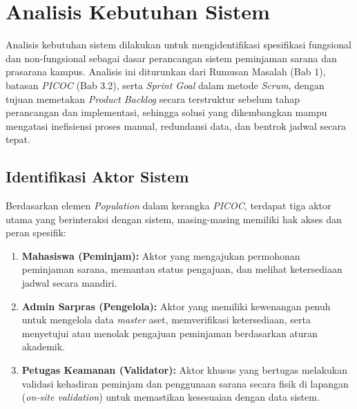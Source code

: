 \section{Analisis Kebutuhan Sistem}
Analisis kebutuhan sistem dilakukan untuk mengidentifikasi spesifikasi fungsional dan non-fungsional sebagai dasar perancangan sistem peminjaman sarana dan prasarana kampus. Analisis ini diturunkan dari Rumusan Masalah (Bab 1), batasan \textit{PICOC} (Bab 3.2), serta \textit{Sprint Goal} dalam metode \textit{Scrum}, dengan tujuan memetakan \textit{Product Backlog} secara terstruktur sebelum tahap perancangan dan implementasi, sehingga solusi yang dikembangkan mampu mengatasi inefisiensi proses manual, redundansi data, dan bentrok jadwal secara tepat.

\subsection{Identifikasi Aktor Sistem}
Berdasarkan elemen \textit{Population} dalam kerangka \textit{PICOC}, terdapat tiga aktor utama yang berinteraksi dengan sistem, masing-masing memiliki hak akses dan peran spesifik:
\begin{enumerate}
    \item \textbf{Mahasiswa (Peminjam):} Aktor yang mengajukan permohonan peminjaman sarana, memantau status pengajuan, dan melihat ketersediaan jadwal secara mandiri.
    \item \textbf{Admin Sarpras (Pengelola):} Aktor yang memiliki kewenangan penuh untuk mengelola data \textit{master} aset, memverifikasi ketersediaan, serta menyetujui atau menolak pengajuan peminjaman berdasarkan aturan akademik.
    \item \textbf{Petugas Keamanan (Validator):} Aktor khusus yang bertugas melakukan validasi kehadiran peminjam dan penggunaan sarana secara fisik di lapangan (\textit{on-site validation}) untuk memastikan kesesuaian dengan data sistem.
\end{enumerate}

